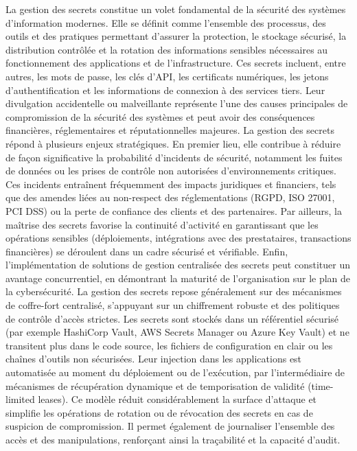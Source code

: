 La gestion des secrets constitue un volet fondamental de la sécurité des systèmes d’information modernes. Elle se définit comme l’ensemble des processus, des outils et des pratiques permettant d’assurer la protection, le stockage sécurisé, la distribution contrôlée et la rotation des informations sensibles nécessaires au fonctionnement des applications et de l’infrastructure. Ces secrets incluent, entre autres, les mots de passe, les clés d’API, les certificats numériques, les jetons d’authentification et les informations de connexion à des services tiers. Leur divulgation accidentelle ou malveillante représente l’une des causes principales de compromission de la sécurité des systèmes et peut avoir des conséquences financières, réglementaires et réputationnelles majeures.
La gestion des secrets répond à plusieurs enjeux stratégiques. En premier lieu, elle contribue à réduire de façon significative la probabilité d’incidents de sécurité, notamment les fuites de données ou les prises de contrôle non autorisées d’environnements critiques. Ces incidents entraînent fréquemment des impacts juridiques et financiers, tels que des amendes liées au non-respect des réglementations (RGPD, ISO 27001, PCI DSS) ou la perte de confiance des clients et des partenaires. Par ailleurs, la maîtrise des secrets favorise la continuité d’activité en garantissant que les opérations sensibles (déploiements, intégrations avec des prestataires, transactions financières) se déroulent dans un cadre sécurisé et vérifiable. Enfin, l’implémentation de solutions de gestion centralisée des secrets peut constituer un avantage concurrentiel, en démontrant la maturité de l’organisation sur le plan de la cybersécurité.
La gestion des secrets repose généralement sur des mécanismes de coffre-fort centralisé, s’appuyant sur un chiffrement robuste et des politiques de contrôle d’accès strictes. Les secrets sont stockés dans un référentiel sécurisé (par exemple HashiCorp Vault, AWS Secrets Manager ou Azure Key Vault) et ne transitent plus dans le code source, les fichiers de configuration en clair ou les chaînes d’outils non sécurisées. Leur injection dans les applications est automatisée au moment du déploiement ou de l’exécution, par l’intermédiaire de mécanismes de récupération dynamique et de temporisation de validité (time-limited leases). Ce modèle réduit considérablement la surface d’attaque et simplifie les opérations de rotation ou de révocation des secrets en cas de suspicion de compromission. Il permet également de journaliser l’ensemble des accès et des manipulations, renforçant ainsi la traçabilité et la capacité d’audit.

